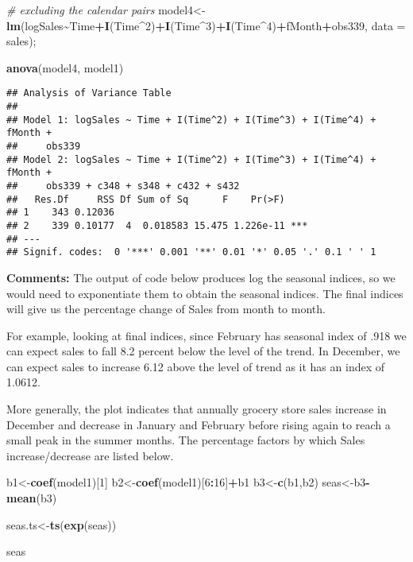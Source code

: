 \documentclass[
]{article}
\newenvironment{Shaded}{\begin{snugshade}}{\end{snugshade}}
\newcommand{\AttributeTok}[1]{\textcolor[rgb]{0.13,0.29,0.53}{#1}}
\newcommand{\CommentTok}[1]{\textcolor[rgb]{0.56,0.35,0.01}{\textit{#1}}}
\newcommand{\DecValTok}[1]{\textcolor[rgb]{0.00,0.00,0.81}{#1}}
\newcommand{\FunctionTok}[1]{\textcolor[rgb]{0.13,0.29,0.53}{\textbf{#1}}}
\newcommand{\NormalTok}[1]{#1}
\newcommand{\OtherTok}[1]{\textcolor[rgb]{0.56,0.35,0.01}{#1}}
\newcommand{\SpecialCharTok}[1]{\textcolor[rgb]{0.81,0.36,0.00}{\textbf{#1}}}
\begin{document}
\begin{Shaded}
\begin{Highlighting}[]
\CommentTok{\# excluding the calendar pairs}
\NormalTok{model4}\OtherTok{\textless{}{-}}\FunctionTok{lm}\NormalTok{(logSales}\SpecialCharTok{\textasciitilde{}}\NormalTok{Time}\SpecialCharTok{+}\FunctionTok{I}\NormalTok{(Time}\SpecialCharTok{\^{}}\DecValTok{2}\NormalTok{)}\SpecialCharTok{+}\FunctionTok{I}\NormalTok{(Time}\SpecialCharTok{\^{}}\DecValTok{3}\NormalTok{)}\SpecialCharTok{+}\FunctionTok{I}\NormalTok{(Time}\SpecialCharTok{\^{}}\DecValTok{4}\NormalTok{)}\SpecialCharTok{+}\NormalTok{fMonth}\SpecialCharTok{+}\NormalTok{obs339, }\AttributeTok{data =}\NormalTok{ sales);}

\FunctionTok{anova}\NormalTok{(model4, model1)}
\end{Highlighting}
\end{Shaded}

\begin{verbatim}
## Analysis of Variance Table
## 
## Model 1: logSales ~ Time + I(Time^2) + I(Time^3) + I(Time^4) + fMonth + 
##     obs339
## Model 2: logSales ~ Time + I(Time^2) + I(Time^3) + I(Time^4) + fMonth + 
##     obs339 + c348 + s348 + c432 + s432
##   Res.Df     RSS Df Sum of Sq      F    Pr(>F)    
## 1    343 0.12036                                  
## 2    339 0.10177  4  0.018583 15.475 1.226e-11 ***
## ---
## Signif. codes:  0 '***' 0.001 '**' 0.01 '*' 0.05 '.' 0.1 ' ' 1
\end{verbatim}

\textbf{Comments: } The output of code below produces log the seasonal
indices, so we would need to exponentiate them to obtain the seasonal
indices. The final indices will give us the percentage change of Sales
from month to month.

For example, looking at final indices, since February has seasonal index
of .918 we can expect sales to fall 8.2 percent below the level of the
trend. In December, we can expect sales to increase 6.12 above the level
of trend as it has an index of 1.0612.

More generally, the plot indicates that annually grocery store sales
increase in December and decrease in January and February before rising
again to reach a small peak in the summer months. The percentage factors
by which Sales increase/decrease are listed below.

\begin{Shaded}
\begin{Highlighting}[]
\NormalTok{b1}\OtherTok{\textless{}{-}}\FunctionTok{coef}\NormalTok{(model1)[}\DecValTok{1}\NormalTok{]}
\NormalTok{b2}\OtherTok{\textless{}{-}}\FunctionTok{coef}\NormalTok{(model1)[}\DecValTok{6}\SpecialCharTok{:}\DecValTok{16}\NormalTok{]}\SpecialCharTok{+}\NormalTok{b1}
\NormalTok{b3}\OtherTok{\textless{}{-}}\FunctionTok{c}\NormalTok{(b1,b2)}
\NormalTok{seas}\OtherTok{\textless{}{-}}\NormalTok{b3}\SpecialCharTok{{-}}\FunctionTok{mean}\NormalTok{(b3)}

\NormalTok{seas.ts}\OtherTok{\textless{}{-}}\FunctionTok{ts}\NormalTok{(}\FunctionTok{exp}\NormalTok{(seas))}

\NormalTok{seas}
\end{Highlighting}
\end{Shaded}
\end{document}
